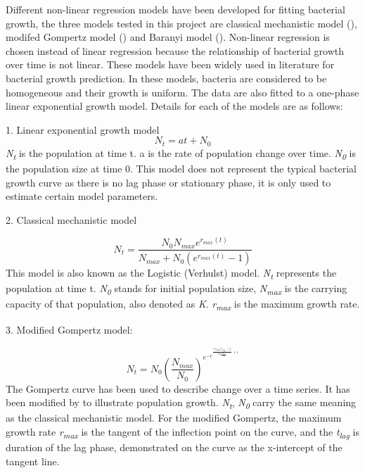 \documentclass[11pt]{article}
\begin{document}
Different non-linear regression models have been developed for fitting bacterial growth, the three models tested in this project are classical mechanistic model (\cite{verhulst1838notice}), modifed Gompertz model (\cite{PMID:16348228}) and Baranyi model (\cite{BARANYI1994277}). Non-linear regression is chosen instead of linear regression because the relationship of bacterial growth over time is not linear. These models have been widely used in literature for bacterial growth prediction. In these models, bacteria are considered to be homogeneous and their growth is uniform. The data are also fitted to a one-phase linear exponential growth model. Details for each of the models are as follows:

1. Linear exponential growth model
\begin{equation}
    N_{t} = at + N_{0}
\end{equation}
\emph{N\textsubscript{t}} is the population at time t. a is the rate of population change over time. \emph{N\textsubscript{0}} is the population size at time 0. This model does not represent the typical bacterial growth curve as there is no lag phase or stationary phase, it is only used to estimate certain model parameters. 

2. Classical mechanistic model

\begin{equation}
    N_{t} = \frac{N_{0} N_{max}  e^{r_{max}(t)}} {N_{max} + N_{0}  (e^{r_{max}(t)} - 1)}
\end{equation}
This model is also known as the Logistic (Verhulst) model. \emph{N\textsubscript{t}} represents the population at time t.  \emph{N\textsubscript{0}} stands for initial population size,  \emph{N\textsubscript{max}} is the carrying capacity of that population, also denoted as \emph{K}. \emph{r\textsubscript{max}} is the maximum growth rate. 

3. Modified Gompertz model:

\begin{equation}
    N_{t} = N_{0}(\frac{N_{max}}{N_{0}}) ^ {e ^ {-e ^ {\frac{e ^1 r_{max}(t_{lag} - t)}{log\frac{N_{max}}{N_{0}}} + 1}}}
\end{equation}
The Gompertz curve has been used to describe change over a time series. It has been modified by \cite{PMID:16348228} to illustrate population growth. \emph{N\textsubscript{t}}, \emph{N\textsubscript{0}} carry the same meaning as the classical mechanistic model. For the modified Gompertz, the maximum growth rate \emph{r\textsubscript{max}} is the tangent of the inflection point on the curve, and the \emph{t\textsubscript{lag}} is duration of the lag phase, demonstrated on the curve as the x-intercept of the tangent line. 
\end{document}
